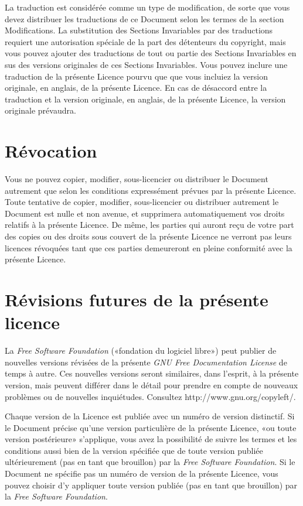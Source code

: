 La traduction est considérée comme un type de modification,
de sorte que vous devez distribuer les traductions de ce Document
selon les termes de la section Modifications. La substitution des
Sections Invariables par des traductions requiert une autorisation
spéciale de la part des détenteurs du copyright, mais vous pouvez
ajouter des traductions de tout ou partie des Sections Invariables
en sus des versions originales de ces Sections Invariables. Vous pouvez
inclure une traduction de la présente Licence pourvu que que vous
incluiez la version originale, en anglais, de la présente Licence.
En cas de désaccord entre la traduction et la version originale, en
anglais, de la présente Licence, la version originale prévaudra. 


\section{Révocation} 

Vous ne pouvez copier, modifier, sous-licencier ou distribuer
le Document autrement que selon les conditions expressément prévues
par la présente Licence. Toute tentative de copier, modifier, sous-licencier
ou distribuer autrement le Document est nulle et non avenue, et supprimera
automatiquement vos droits relatifs à la présente Licence. De même,
les parties qui auront reçu de votre part des copies ou des droits
sous couvert de la présente Licence ne verront pas leurs licences
révoquées tant que ces parties demeureront en pleine conformité avec
la présente Licence. 


\section{Révisions futures de la présente licence} 

La \emph{Free Software Foundation} («fondation du logiciel
libre») peut publier de nouvelles versions révisées de la présente
\emph{GNU Free Documentation License} de temps à autre. Ces nouvelles
versions seront similaires, dans l'esprit, à la présente version,
mais peuvent différer dans le détail pour prendre en compte de nouveaux
problèmes ou de nouvelles inquiétudes. Consultez http://www.gnu.org/copyleft/. 

Chaque version de la Licence est publiée avec un numéro
de version distinctif. Si le Document précise qu'une version particulière
de la présente Licence, «ou toute version postérieure» s'applique,
vous avez la possibilité de suivre les termes et les conditions aussi
bien de la version spécifiée que de toute version publiée ultérieurement
(pas en tant que brouillon) par la \emph{Free Software Foundation}.
Si le Document ne spécifie pas un numéro de version de la présente
Licence, vous pouvez choisir d'y appliquer toute version publiée (pas
en tant que brouillon) par la \emph{Free Software Foundation}. 


